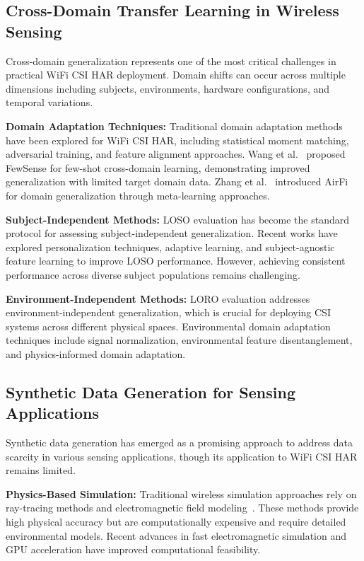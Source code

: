 \documentclass[journal]{IEEEtran}
\begin{document}
\subsection{Cross-Domain Transfer Learning in Wireless Sensing}

Cross-domain generalization represents one of the most critical challenges in practical WiFi CSI HAR deployment. Domain shifts can occur across multiple dimensions including subjects, environments, hardware configurations, and temporal variations.

\textbf{Domain Adaptation Techniques:} Traditional domain adaptation methods have been explored for WiFi CSI HAR, including statistical moment matching, adversarial training, and feature alignment approaches. Wang et al.~\cite{fewsense2022} proposed FewSense for few-shot cross-domain learning, demonstrating improved generalization with limited target domain data. Zhang et al.~\cite{airfi2022} introduced AirFi for domain generalization through meta-learning approaches.

\textbf{Subject-Independent Methods:} LOSO evaluation has become the standard protocol for assessing subject-independent generalization. Recent works have explored personalization techniques, adaptive learning, and subject-agnostic feature learning to improve LOSO performance. However, achieving consistent performance across diverse subject populations remains challenging.

\textbf{Environment-Independent Methods:} LORO evaluation addresses environment-independent generalization, which is crucial for deploying CSI systems across different physical spaces. Environmental domain adaptation techniques include signal normalization, environmental feature disentanglement, and physics-informed domain adaptation.

\subsection{Synthetic Data Generation for Sensing Applications}

Synthetic data generation has emerged as a promising approach to address data scarcity in various sensing applications, though its application to WiFi CSI HAR remains limited.

\textbf{Physics-Based Simulation:} Traditional wireless simulation approaches rely on ray-tracing methods and electromagnetic field modeling~\cite{ray_tracing_wireless2000}. These methods provide high physical accuracy but are computationally expensive and require detailed environmental models. Recent advances in fast electromagnetic simulation and GPU acceleration have improved computational feasibility.
\end{document}
